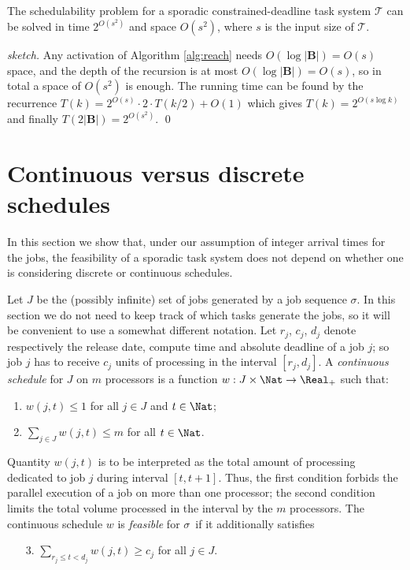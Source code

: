 \documentclass{llncs}
\newcommand{\tsys}{\ensuremath{\mathcal{T}}}
\newcommand{\seq}{\ensuremath{\sigma}}
\newcommand{\backlog}{\ensuremath{\mathbf{B}}}
\begin{document}
\begin{theorem}
The schedulability problem for a sporadic constrained-deadline task system $\tsys$ can be solved in time $2^{O(s^2)}$ and space $O(s^2)$, where $s$ is the input size of $\tsys$. 
\end{theorem}
\begin{proof}[sketch]
Any activation of Algorithm \ref{alg:reach} needs $O(\log |\backlog|)=O(s)$ space, and the depth of the recursion is at most $O(\log |\backlog|)=O(s)$, so in total a space of $O(s^2)$ is enough. The running time can be found by the recurrence $T(k) = 2^{O(s)} \cdot 2 \cdot T(k/2) + O(1) $ which gives $T(k) = 2^{O(s \log k)}$ and finally $T(2|\backlog|)=2^{O(s^2)}$. 
\qed
\end{proof}




\section{Continuous versus discrete schedules}
\label{sec:continuous}
In this section we show that, under our assumption of integer arrival times for the jobs, the feasibility of a sporadic task system does not depend on whether one is considering discrete or continuous schedules. 

Let $J$ be the (possibly infinite) set of jobs generated by a job sequence $\seq$. In this section we do not need to keep track of which tasks generate the jobs, so it will be convenient to use a somewhat different notation. Let $r_j$, $c_j$, $d_j$ denote respectively the release date, compute time and absolute deadline of a job $j$; so job $j$ has to receive $c_j$ units of processing in the interval $[r_j,d_j]$. A \emph{continuous schedule} for $J$ on $m$ processors is a function $w : J \times \Nat \to \Real_+$ such that:
\begin{enumerate}
\item $w(j,t) \le 1$ for all $j \in J$ and $t \in \Nat$;
\item $\sum_{j \in J} w(j,t) \le m$ for all $t \in \Nat$.   
\end{enumerate}
Quantity $w(j,t)$ is to be interpreted as the total amount of processing dedicated to job $j$ during interval $[t,t+1]$. Thus, the first condition forbids the parallel execution of a job on more than one processor; the second condition limits the total volume processed in the interval by the $m$ processors. 
The continuous schedule $w$ is \emph{feasible} for \seq\ if it additionally satisfies 
\begin{enumerate}
\item[3.] $\sum_{r_j \le t < d_j} w(j,t) \ge c_j$ for all $j \in J$.
\end{enumerate}
\end{document}
